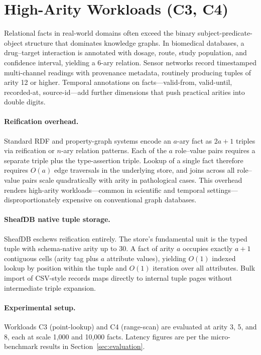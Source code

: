 \section{High-Arity Workloads (C3, C4)}
\label{sec:high_arity}

Relational facts in real-world domains often exceed the binary subject-predicate-object structure that dominates knowledge graphs. In biomedical databases, a drug--target interaction is annotated with dosage, route, study population, and confidence interval, yielding a 6-ary relation. Sensor networks record timestamped multi-channel readings with provenance metadata, routinely producing tuples of arity 12 or higher. Temporal annotations on facts---valid-from, valid-until, recorded-at, source-id---add further dimensions that push practical arities into double digits.

\paragraph{Reification overhead.}
Standard RDF and property-graph systems encode an $a$-ary fact as $2a+1$ triples via reification or $n$-ary relation patterns. Each of the $a$ role--value pairs requires a separate triple plus the type-assertion triple. Lookup of a single fact therefore requires $O(a)$ edge traversals in the underlying store, and joins across all role--value pairs scale quadratically with arity in pathological cases. This overhead renders high-arity workloads---common in scientific and temporal settings---disproportionately expensive on conventional graph databases.

\paragraph{SheafDB native tuple storage.}
SheafDB eschews reification entirely. The store's fundamental unit is the typed tuple with schema-native arity up to 30. A fact of arity $a$ occupies exactly $a+1$ contiguous cells (arity tag plus $a$ attribute values), yielding $O(1)$ indexed lookup by position within the tuple and $O(1)$ iteration over all attributes. Bulk import of CSV-style records maps directly to internal tuple pages without intermediate triple expansion.

\paragraph{Experimental setup.}
Workloads C3 (point-lookup) and C4 (range-scan) are evaluated at arity 3, 5, and 8, each at scale 1,000 and 10,000 facts. Latency figures are per the micro-benchmark results in Section~\ref{sec:evaluation}.

